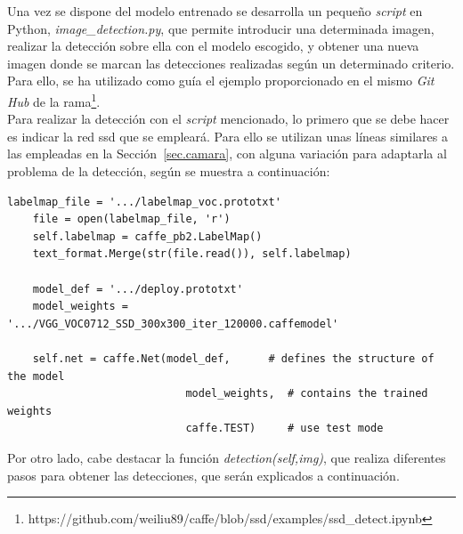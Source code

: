 Una vez se dispone del modelo entrenado se desarrolla un pequeño \textit{script} en Python, \textit{image\_detection.py}, que permite introducir una determinada imagen, realizar la detección sobre ella con el modelo escogido, y obtener una nueva imagen donde se marcan las detecciones realizadas según un determinado criterio. Para ello, se ha utilizado como guía el ejemplo proporcionado en el mismo \textit{Git Hub} de la rama\footnote{https://github.com/weiliu89/caffe/blob/ssd/examples/ssd\_detect.ipynb}.\\

Para realizar la detección con el \textit{script} mencionado, lo primero que se debe hacer es indicar la red \acrshort{ssd} que se empleará. Para ello se utilizan unas líneas similares a las empleadas en la Sección~\ref{sec.camara}, con alguna variación para adaptarla al problema de la detección, según se muestra a continuación:
\vspace{10pt}
\begin{lstlisting}[frame=single]
	labelmap_file = '.../labelmap_voc.prototxt'
	file = open(labelmap_file, 'r')
	self.labelmap = caffe_pb2.LabelMap()
	text_format.Merge(str(file.read()), self.labelmap)
	
	model_def = '.../deploy.prototxt'
	model_weights = '.../VGG_VOC0712_SSD_300x300_iter_120000.caffemodel'
	
	self.net = caffe.Net(model_def,      # defines the structure of the model
							model_weights,  # contains the trained weights
							caffe.TEST)     # use test mode 
\end{lstlisting}

Por otro lado, cabe destacar la función \textit{detection(self,img)}, que realiza diferentes pasos para obtener las detecciones, que serán explicados a continuación.

